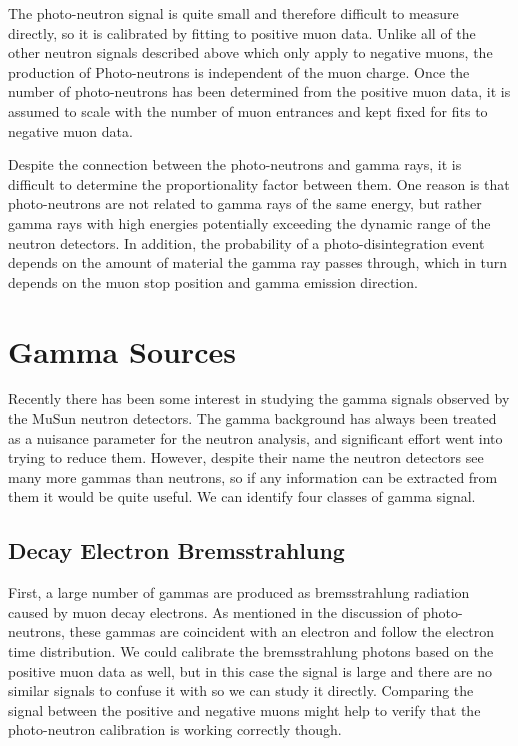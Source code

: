 The photo-neutron signal is quite small and therefore difficult to measure directly, so it is calibrated by fitting to positive muon data.
Unlike all of the other neutron signals described above which only apply to negative muons, the production of Photo-neutrons is independent of the muon charge.
Once the number of photo-neutrons has been determined from the positive muon data, it is assumed to scale with the number of muon entrances and kept fixed for fits to negative muon data.

Despite the connection between the photo-neutrons and gamma rays, it is difficult to determine the proportionality factor between them.  
One reason is that photo-neutrons are not related to gamma rays of the same energy, but rather gamma rays with high energies potentially exceeding the dynamic range of the neutron detectors.
In addition, the probability of a photo-disintegration event depends on the amount of material the gamma ray passes through, which in turn depends on the muon stop position and gamma emission direction.  

\section{Gamma Sources}

Recently there has been some interest in studying the gamma signals observed by the MuSun neutron detectors.
The gamma background has always been treated as a nuisance parameter for the neutron analysis, and significant effort went into trying to reduce them.
However, despite their name the neutron detectors see many more gammas than neutrons, so if any information can be extracted from them it would be quite useful.
We can identify four classes of gamma signal.

\subsection{Decay Electron Bremsstrahlung}

First, a large number of gammas are produced as bremsstrahlung radiation caused by muon decay electrons.  
As mentioned in the discussion of photo-neutrons, these gammas are coincident with an electron and follow the electron time distribution.
We could calibrate the bremsstrahlung photons based on the positive muon data as well, but in this case the signal is large and there are no similar signals to confuse it with so we can study it directly.
Comparing the signal between the positive and negative muons might help to verify that the photo-neutron calibration is working correctly though.

